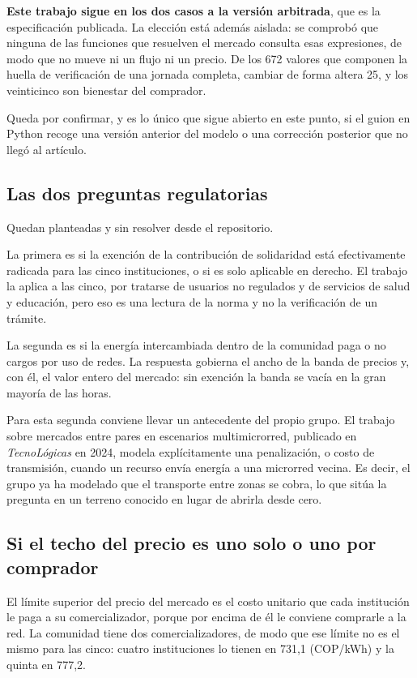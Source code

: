\textbf{Este trabajo sigue en los dos casos a la versión arbitrada}, que es
la especificación publicada. La elección está además aislada: se comprobó
que ninguna de las funciones que resuelven el mercado consulta esas
expresiones, de modo que no mueve ni un flujo ni un precio. De los \num{672}
valores que componen la huella de verificación de una jornada completa,
cambiar de forma altera \num{25}, y los veinticinco son bienestar del
comprador.

Queda por confirmar, y es lo único que sigue abierto en este punto, si el
guion en Python recoge una versión anterior del modelo o una corrección
posterior que no llegó al artículo.

\subsection{Las dos preguntas regulatorias}
\label{sub:preg-regulatorias}

Quedan planteadas y sin resolver desde el repositorio.

La primera es si la exención de la contribución de solidaridad está
efectivamente radicada para las cinco instituciones, o si es solo aplicable
en derecho. El trabajo la aplica a las cinco, por tratarse de usuarios no
regulados y de servicios de salud y educación, pero eso es una lectura de la
norma y no la verificación de un trámite.

La segunda es si la energía intercambiada dentro de la comunidad paga o no
cargos por uso de redes. La respuesta gobierna el ancho de la banda de
precios y, con él, el valor entero del mercado: sin exención la banda se
vacía en la gran mayoría de las horas.

Para esta segunda conviene llevar un antecedente del propio grupo. El
trabajo sobre mercados entre pares en escenarios multimicrorred, publicado
en \emph{TecnoLógicas} en 2024, modela explícitamente una penalización, o
costo de transmisión, cuando un recurso envía energía a una microrred
vecina. Es decir, el grupo ya ha modelado que el transporte entre zonas se
cobra, lo que sitúa la pregunta en un terreno conocido en lugar de abrirla
desde cero.

\subsection{Si el techo del precio es uno solo o uno por comprador}
\label{sub:preg-techo}

El límite superior del precio del mercado es el costo unitario que cada
institución le paga a su comercializador, porque por encima de él le
conviene comprarle a la red. La comunidad tiene dos comercializadores, de
modo que ese límite no es el mismo para las cinco: cuatro instituciones lo
tienen en 731,1 (COP/kWh) y la quinta en 777,2.

